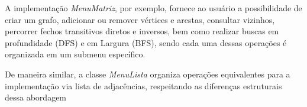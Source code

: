 \documentclass{sbc2023}%
\begin{document}


    A implementação \textit{MenuMatriz}, por exemplo, fornece ao usuário a possibilidade de criar um grafo, adicionar ou remover vértices e arestas, consultar vizinhos, percorrer fechos transitivos diretos e inversos, bem como realizar buscas em profundidade (DFS) e em Largura (BFS), sendo cada uma dessas operações é organizada em um submenu específico.




    De maneira similar, a classe \textit{MenuLista} organiza operações equivalentes para a implementação via lista de adjacências, respeitando as diferenças estruturais dessa abordagem
\end{document}

